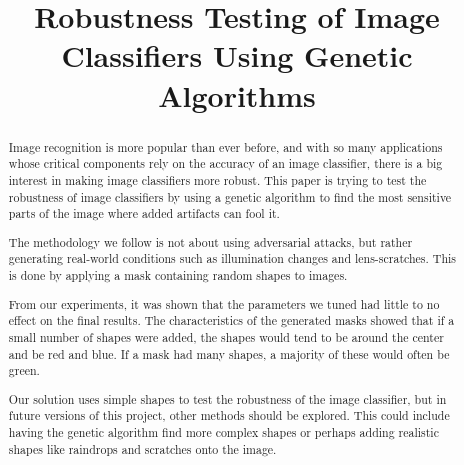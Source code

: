\documentclass[conference]{IEEEtran}
\begin{document}
\balance

\title{Robustness Testing of Image Classifiers Using Genetic Algorithms\\{}}

\author{
}

\maketitle
\begin{abstract}
Image recognition is more popular than ever before, and with so many applications whose critical components rely on the accuracy of an image classifier, there is a big interest in making image classifiers more robust.
This paper is trying to test the robustness of image classifiers by using a genetic algorithm to find the most sensitive parts of the image where added artifacts can fool it.

The methodology we follow is not about using adversarial attacks, but rather generating real-world conditions such as illumination changes and lens-scratches. This is done by applying a mask containing random shapes to images.

From our experiments, it was shown that the parameters we tuned had little to no effect on the final results.
The characteristics of the generated masks showed that if a small number of shapes were added, the shapes would tend to be around the center and be red and blue. If a mask had many shapes, a majority of these would often be green.

Our solution uses simple shapes to test the robustness of the image classifier, but in future versions of this project, other methods should be explored.
This could include having the genetic algorithm find more complex shapes or perhaps adding realistic shapes like raindrops and scratches onto the image.
\end{abstract}
\end{document}
